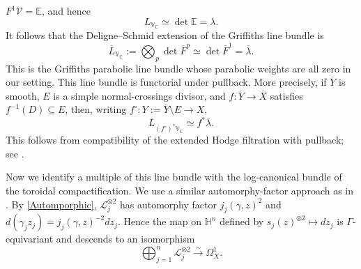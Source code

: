 \documentclass[12 pt]{amsart}
\theoremstyle{definition}
\begin{document}
\(F^1\mathcal V=\mathbb E\), and hence
\[
L_{\mathbb V_{\mathbb C}}
\simeq
\det\mathbb E
=
\lambda.
\]
 It follows that the Deligne--Schmid extension of the Griffiths line bundle is
\begin{equation}\label{eq:extended-Griffiths-is-Hodge}
\overline L_{\mathbb V_{\mathbb C}}
:=
\bigotimes_p\det\overline F^p
\simeq
\det\overline F^1
=
\overline\lambda.
\end{equation}
This is the Griffiths parabolic line bundle whose parabolic weights
are all zero in our setting. This line bundle is
functorial under pullback. More precisely, if $\overline Y$ is smooth, $E$ is a simple
normal-crossings divisor, and
$f:\overline Y\to\overline X$ satisfies $f^{-1}(D)\subseteq E$,
then, writing $f^\circ:Y:=\overline Y\setminus E\to X$,
\[
\overline L_{(f^\circ)^*\mathbb V_{\mathbb C}}
\simeq f^*\overline\lambda.
\]
This follows from compatibility of the extended Hodge filtration
with pullback; see
\cite[\S 2.2]{brunebarbe2020increasing}.


Now we identify a multiple of this line bundle with the log-canonical bundle of the toroidal compactification. We use a similar automorphy-factor approach as in \cite[Section II.1]{hulek2002geometry}. By \eqref{Automporphic}, $\mathcal L_j^{\otimes2}$ has automorphy factor $j_j(\gamma,z)^2$ and
\(d(\gamma_jz_j)=j_j(\gamma,z)^{-2}dz_j.\)
Hence the map on $\mathbb H^n$ defined by
\(s_j(z)^{\otimes2}\mapsto dz_j\)
is $\Gamma$-equivariant and descends to an isomorphism
\[
\bigoplus_{j=1}^n\mathcal L_j^{\otimes2}\xrightarrow{\sim}\Omega_X^1.
\]
\end{document}
